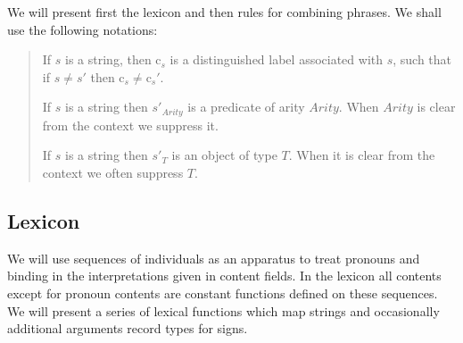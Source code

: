 \begin{display}

\end{display}

We will present first the lexicon and then rules for
combining phrases.  We shall use the following notations:
\begin{quote}
If $s$ is a string, then c$_s$ is a distinguished label associated
with $s$, such that if $s\not=s'$ then c$_s$$\not=$c$_s'$.

If $s$ is a string then $s'_{\mathit{Arity}}$ is a predicate of arity
$\mathit{Arity}$.  When $\mathit{Arity}$ is clear from the context we
suppress it.

If $s$ is a string then $s'_T$ is an object of type $T$.  When it is
clear from the context we often suppress $T$.


\end{quote}


\subsection{Lexicon}
  We will use sequences of
individuals as an
apparatus to treat pronouns and binding in the interpretations given
in content fields.  In the lexicon all contents except for pronoun
contents are constant functions defined on these sequences.  We will present a series of lexical functions which map strings and
occasionally additional arguments record types for signs.  

